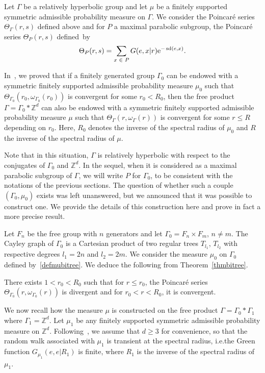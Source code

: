 \documentclass[10pt]{amsart}
\theoremstyle{definition}\newtheorem{defi}[theo]{Definition}\newtheorem{rema}[theo]{Remark}\newtheorem{exam}[theo]{Example}\newtheorem{exem}[theo]{Example}\newtheorem{nota}[theo]{Notation}
\newcommand{\Z}{\mathbb{Z}}
\newcommand{\rme}{\mathrm{e}}
\DeclareMathOperator{\sd}{sd}
\let\oldin\in
\renewcommand{\in}{\mathchoice{\oldin}{\oldin}{\,\oldin\,}{\,\oldin\,}}
\begin{document}
Let $\Gamma$ be a relatively hyperbolic group and let $\mu$ be a finitely supported symmetric admissible probability measure on $\Gamma$. We consider the Poincaré series $\Theta_\Gamma(r,s)$ defined above and for $P$ a maximal parabolic subgroup, the Poincaré series $\Theta_P(r,s)$ defined~by
\[
\Theta_P(r,s)=\sum_{x\in P}G(e,x|r)\rme^{-\sd(e,x)}.
\]

In~\cite[Example~C]{DWY}, we proved that if a finitely generated group $\Gamma_0$ can be endowed with a symmetric finitely supported admissible probability measure $\mu_0$ such that $\Theta_{\Gamma_0}(r_0,\omega_{\Gamma_0}(r_0))$ is convergent for some $r_0<R_0$, then the free product $\Gamma=\Gamma_0*\Z^d$ can also be endowed with a symmetric finitely supported admissible probability measure $\mu$ such that $\Theta_{\Gamma}(r,\omega_{\Gamma}(r))$ is convergent for some $r\leq R$ depending on $r_0$. Here, $R_0$ denotes the inverse of the spectral radius of $\mu_0$ and $R$ the inverse of the spectral radius of $\mu$.

Note that in this situation, $\Gamma$ is relatively hyperbolic with respect to the conjugates of $\Gamma_0$ and $\Z^d$. In the sequel, when it is considered as a maximal parabolic subgroup of $\Gamma$, we will write $P$ for $\Gamma_0$, to be consistent with the notations of the previous sections. The question of whether such a couple $(\Gamma_0,\mu_0)$ exists was left unanswered, but we announced that it was possible to construct one. We provide the details of this construction here and prove in fact a more precise result.

\medskip
Let $F_n$ be the free group with $n$ generators and let $\Gamma_0=F_n\times F_m$, $n\neq m$. The Cayley graph of $\Gamma_0$ is a Cartesian product of two regular trees $T_{l_1}$, $T_{l_2}$ {with respective degrees $l_1 = 2n$ and $l_2 = 2m$}. We consider the measure $\mu_0$ on $\Gamma_0$ defined by~\eqref{defmubitree}. We deduce the following from Theorem~\ref{thmbitree}.

\begin{prop}\label{transitionphaseparabolicsubgroup}
There exists $1<r_0 <R_0$ such that for $r\leq r_0$, the Poincaré series $\Theta_{\Gamma_0}(r,\omega_{\Gamma_0}(r))$ is divergent and for $r_0<r<R_0$, it is convergent.
\end{prop}

We now recall how the measure $\mu$ is constructed on the free product $\Gamma=\Gamma_0*\Gamma_1$ where $\Gamma_1=\Z^d$. Let $\mu_1$ be any finitely supported symmetric admissible probability measure on $\Z^d$. Following~\cite{DWY}, we assume that $d\geq3$ for convenience, so that the random walk associated with $\mu_1$ is transient at the spectral radius, i.e.the Green function $G_{\mu_1}(e,e|R_1)$ is finite, where $R_1$ is the inverse of the spectral radius of $\mu_1$.
\end{document}
